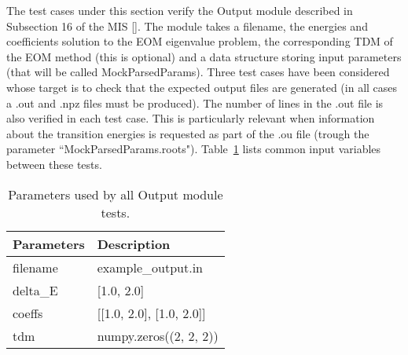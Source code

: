 \documentclass[12pt, titlepage]{article}
\begin{document}
The test cases under this section verify the Output module described in 
Subsection 16 of the MIS [\cite{MIS2020}]. The module takes a filename, the 
energies and coefficients solution to the EOM eigenvalue problem, the 
corresponding TDM of the EOM method (this is optional) and a 
data structure storing input parameters (that will be called MockParsedParams). 
Three test cases have been 
considered whose target is to check that the expected output files are 
generated (in all cases a .out and .npz files must be produced). The number of 
lines in the .out file is also verified in each test case. This is particularly 
relevant when information about the transition energies is requested as part of 
the .ou file (trough the parameter ``MockParsedParams.roots").
Table~\ref{table:dumpdata} lists common input variables between these 
tests.
\begin{table}[h!]
	\centering
	\begin{tabular}{ll}
		Parameters& Description\\
		\midrule
		filename& example\_output.in\\
		delta\_E & [1.0, 2.0]\\ 
        coeffs& [[1.0, 2.0], [1.0, 2.0]]\\
        tdm& numpy.zeros((2, 2, 2))\\
        \bottomrule
	\end{tabular}
	\caption{Parameters used by all Output module tests.}
	\label{table:dumpdata}
\end{table}
\end{document}
